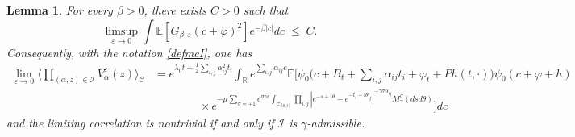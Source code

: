 \documentclass[11pt]{amsart}
\numberwithin{equation}{section}
\newtheorem{lemma}[theorem]{Lemma}
\theoremstyle{definition}
\renewcommand{\leq}{\;\leqslant\;}                   %
\newcommand{\R}{\mathbb{R}}
\newcommand{\cjd}{\rangle}
\newcommand{\cjg}{\langle}
\newcommand{\mc}{\mathcal}
\def\eps{\varepsilon}
\begin{document}
\begin{lemma}\label{lem: vertex correlations}
For every $\beta > 0$, there exists $C>0$ such that
\begin{equation} \label{eq: vc unif l2}
\limsup_{\eps \rightarrow 0}\int \mathbb{E}[G_{\beta,\eps}(c+\varphi)^2] e^{-\beta |c|}dc
\leq
C. 
\end{equation}
Consequently, with the notation \eqref{defmcI}, one has 
\begin{align}\label{eq: vc limit}
\lim_{\eps \rightarrow 0}\Big\cjg \prod_{(\alpha,z)\in \mc{I}}V^\eps_{\alpha}(z)\Big\cjd_{\mc{C}}	
&=
e^{\lambda_0 t+\frac{1}{2}\sum_{i,j}\alpha_{ij}^2t_i}  \int_{\R} e^{\sum_{i,j}\alpha_{ij} c}\mathbb{E}\big[\psi_0\big(c+B_t+\sum_{i,j} \alpha_{ij}t_i+ \varphi_t + Ph (t,\cdot))\psi_0(c+\varphi+h) 
\\
& \qquad \qquad \times e^{-\mu \sum_{\sigma = \pm 1} e^{\sigma\gamma c} \int_{\mathcal{C}_{[0,t]}} \prod_{i,j} |e^{-s+i\theta}-e^{-t_i+i\theta_{ij}}|^{-\gamma \sigma \alpha_{ij}} M^\sigma_\gamma(dsd\theta)}\big ]dc
\end{align}
and the limiting correlation is nontrivial if and only if $\mathcal I$ is $\gamma$-admissible.

\end{lemma}
\end{document}
